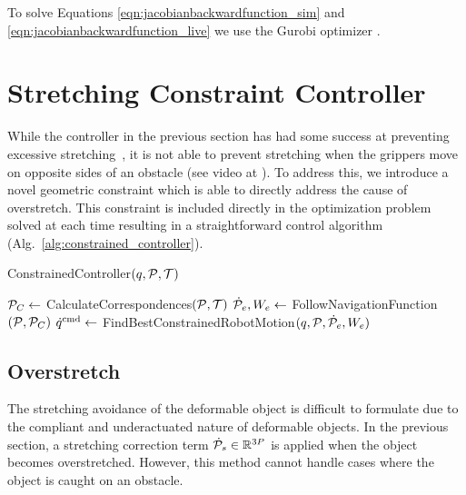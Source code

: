 To solve Equations \eqref{eqn:jacobianbackwardfunction_sim} and \eqref{eqn:jacobianbackwardfunction_live} we use the Gurobi optimizer \cite{Gurobi2016}.


\section{Stretching Constraint Controller}
\label{sec:stretching_constraint_controller}

While the controller in the previous section has had some success at preventing excessive stretching~\cite{Berenson2013}, it is not able to prevent stretching when the grippers move on opposite sides of an obstacle (see video at \irosurl). To address this, we introduce a novel geometric constraint which is able to directly address the cause of overstretch. This constraint is included directly in the optimization problem solved at each time resulting in a straightforward control algorithm (Alg.~\ref{alg:constrained_controller}).

\begin{algorithm}[h]
    \caption{ConstrainedController$(q, \mathcal{P}, \mathcal{T})$}
    \begin{algorithmic}[1]
        \State $\mathcal{P}_C \gets$ CalculateCorrespondences$(\mathcal{P}, \mathcal{T})$
        \State $\dot{\mathcal{P}}_e, W_e \gets$ FollowNavigationFunction$(\mathcal{P}, \mathcal{P}_C)$
        \State $\dot{q}^{\textrm{cmd}} \gets$ FindBestConstrainedRobotMotion$(q, \mathcal{P}, \dot{\mathcal{P}}_e, W_e)$
    \end{algorithmic}
    \label{alg:constrained_controller}
\end{algorithm}


\subsection{Overstretch}
\label{Method_Overstretch}
The stretching avoidance of the deformable object is difficult to formulate due to the compliant and underactuated nature of deformable objects. In the previous section, a stretching correction term $\dot{\mathcal{P}}_s \in \mathbb{R}^{3P}$ is applied when the object becomes overstretched. However, this method cannot handle cases where the object is caught on an obstacle.

